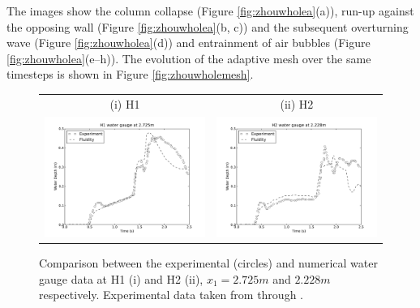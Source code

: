 The images show the column collapse (Figure \ref{fig:zhouwholea}(a)), run-up against the opposing wall (Figure \ref{fig:zhouwholea}(b, c)) and the subsequent overturning wave (Figure \ref{fig:zhouwholea}(d)) and entrainment of air bubbles (Figure \ref{fig:zhouwholea}(e--h)). The evolution of the adaptive mesh over the same timesteps is shown in Figure \ref{fig:zhouwholemesh}. 

\begin{figure}[tbp]
\begin{center}
\begin{tabular}{cc}
\hspace{1cm}(i) H1 & (ii) H2  \\
\includegraphics[width=7cm]{examples_images/water_collapse/water_gauge_H1.pdf} & \includegraphics[width=7cm]{examples_images/water_collapse/water_gauge_H2.pdf}\\
\end{tabular}
\caption{Comparison between the experimental (circles) and numerical water gauge data at H1 (i) and H2 (ii), $x_1 = 2.725m$ and $2.228m$ respectively. Experimental data taken from \citet{zhou_nonlinear_1999} through \citet{park_volume-of-fluid_2009}.}
\label{fig:zhoudepth}
\end{center}
\end{figure}

